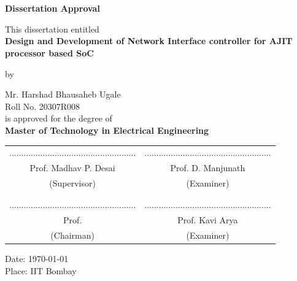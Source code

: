 \documentclass[12pt]{report}
\begin{document}
\newpage
{}
\chapter*{}
\begin{center}
{\Large \textbf{Dissertation Approval}}

\bigskip
\bigskip
\bigskip
This dissertation entitled\\
\bigskip
\textbf{Design and Development of Network Interface controller for AJIT processor based SoC}\\
\bigskip

by\\
\bigskip

Mr. Harshad Bhausaheb Ugale\\
Roll No. 20307R008\\
\bigskip
is   approved for the degree of\\
\textbf{Master of Technology in Electrical Engineering}\\

\end{center}
 \vspace{10mm}
\begingroup
\setlength{\tabcolsep}{30pt}
\begin{center}
    \begin{tabular}{c c}
        ..................................................... & .....................................................\\
        Prof. Madhav P. Desai & Prof. D. Manjunath\\
        (Supervisor)     & (Examiner)\\
        \\\\
        ..................................................... & .....................................................\\
        Prof.   & Prof. Kavi Arya\\
        (Chairman) & (Examiner)\\
    \end{tabular}
\end{center}
\endgroup
\bigskip
{Date: \today}\\
{Place: IIT Bombay}


\newpage
\end{document}
